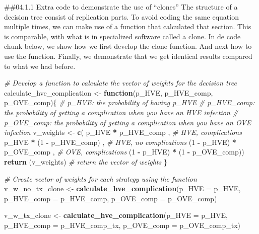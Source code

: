 \documentclass[
]{article}
\newenvironment{Shaded}{\begin{snugshade}}{\end{snugshade}}
\newcommand{\AttributeTok}[1]{\textcolor[rgb]{0.13,0.29,0.53}{#1}}
\newcommand{\CommentTok}[1]{\textcolor[rgb]{0.56,0.35,0.01}{\textit{#1}}}
\newcommand{\ControlFlowTok}[1]{\textcolor[rgb]{0.13,0.29,0.53}{\textbf{#1}}}
\newcommand{\DecValTok}[1]{\textcolor[rgb]{0.00,0.00,0.81}{#1}}
\newcommand{\FunctionTok}[1]{\textcolor[rgb]{0.13,0.29,0.53}{\textbf{#1}}}
\newcommand{\NormalTok}[1]{#1}
\newcommand{\OtherTok}[1]{\textcolor[rgb]{0.56,0.35,0.01}{#1}}
\newcommand{\SpecialCharTok}[1]{\textcolor[rgb]{0.81,0.36,0.00}{\textbf{#1}}}
\begin{document}
\#\#04.1.1 Extra code to demonstrate the use of ``clones'' The structure
of a decision tree consist of replication parts. To avoid coding the
same equation multiple times, we can make use of a function that
calculated that section. This is comparable, with what is in specialized
software called a clone. In de code chunk below, we show how we first
develop the clone function. And next how to use the function. Finally,
we demonstrate that we get identical results compared to what we had
before.

\begin{Shaded}
\begin{Highlighting}[]
\CommentTok{\# Develop a function to calculate the vector of weights for the decision tree}
\NormalTok{calculate\_hve\_complication }\OtherTok{\textless{}{-}} \ControlFlowTok{function}\NormalTok{(p\_HVE, p\_HVE\_comp, p\_OVE\_comp)\{}
    \CommentTok{\# p\_HVE: the probability of having p\_HVE}
    \CommentTok{\# p\_HVE\_comp: the probability of getting a complication when you have an HVE infection}
    \CommentTok{\# p\_OVE\_comp: the probability of getting a complication when you have an OVE infection}
\NormalTok{       v\_weights }\OtherTok{\textless{}{-}}  \FunctionTok{c}\NormalTok{(    p\_HVE  }\SpecialCharTok{*}\NormalTok{      p\_HVE\_comp     ,  }\CommentTok{\# HVE, complications}
\NormalTok{                            p\_HVE  }\SpecialCharTok{*}\NormalTok{ (}\DecValTok{1} \SpecialCharTok{{-}}\NormalTok{ p\_HVE\_comp)    ,  }\CommentTok{\# HVE, no complications}
\NormalTok{                       (}\DecValTok{1} \SpecialCharTok{{-}}\NormalTok{ p\_HVE) }\SpecialCharTok{*}\NormalTok{      p\_OVE\_comp     ,  }\CommentTok{\# OVE, complications}
\NormalTok{                       (}\DecValTok{1} \SpecialCharTok{{-}}\NormalTok{ p\_HVE) }\SpecialCharTok{*}\NormalTok{ (}\DecValTok{1} \SpecialCharTok{{-}}\NormalTok{ p\_OVE\_comp))}
        \FunctionTok{return}\NormalTok{ (v\_weights) }\CommentTok{\# return the vector of weights}
\NormalTok{         \}}

\CommentTok{\# Create vector of weights for each strategy using the function }
\NormalTok{v\_w\_no\_tx\_clone  }\OtherTok{\textless{}{-}} \FunctionTok{calculate\_hve\_complication}\NormalTok{(}\AttributeTok{p\_HVE =}\NormalTok{ p\_HVE, }\AttributeTok{p\_HVE\_comp =}\NormalTok{ p\_HVE\_comp, }\AttributeTok{p\_OVE\_comp =}\NormalTok{ p\_OVE\_comp)}
  
\NormalTok{v\_w\_tx\_clone     }\OtherTok{\textless{}{-}} \FunctionTok{calculate\_hve\_complication}\NormalTok{(}\AttributeTok{p\_HVE =}\NormalTok{ p\_HVE, }\AttributeTok{p\_HVE\_comp =}\NormalTok{ p\_HVE\_comp\_tx, }\AttributeTok{p\_OVE\_comp =}\NormalTok{ p\_OVE\_comp\_tx)}


\end{Highlighting}
\end{Shaded}
\end{document}
